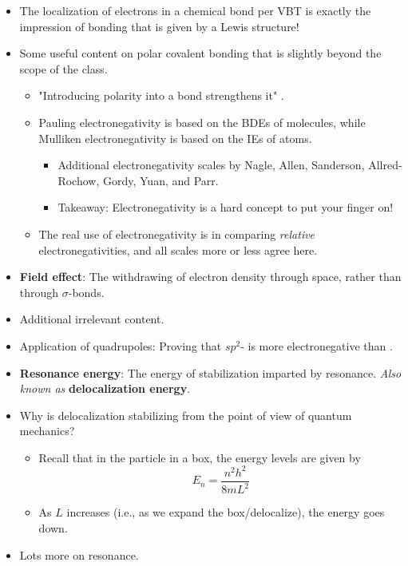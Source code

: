 \documentclass[../notes.tex]{subfiles}
\begin{document}
\begin{itemize}
    \item The localization of electrons in a chemical bond per VBT is exactly the impression of bonding that is given by a Lewis structure!
    \item Some useful content on polar covalent bonding that is slightly beyond the scope of the class.
    \begin{itemize}
        \item "Introducing polarity into a bond strengthens it" \parencite[12]{bib:Anslyn}.
        \item Pauling electronegativity is based on the BDEs of molecules, while Mulliken electronegativity is based on the IEs of atoms.
        \begin{itemize}
            \item Additional electronegativity scales by Nagle, Allen, Sanderson, Allred-Rochow, Gordy, Yuan, and Parr.
            \item Takeaway: Electronegativity is a hard concept to put your finger on!
        \end{itemize}
        \item The real use of electronegativity is in comparing \emph{relative} electronegativities, and all scales more or less agree here.
    \end{itemize}
    \item \textbf{Field effect}: The withdrawing of electron density through space, rather than through $\sigma$-bonds.
    \item Additional irrelevant content.
    \item Application of quadrupoles: Proving that $sp^2$- is more electronegative than .
    \item \textbf{Resonance energy}: The energy of stabilization imparted by resonance. \emph{Also known as} \textbf{delocalization energy}.
    \item Why is delocalization stabilizing from the point of view of quantum mechanics?
    \begin{itemize}
        \item Recall that in the particle in a box, the energy levels are given by
        \begin{equation*}
            E_n = \frac{n^2h^2}{8mL^2}
        \end{equation*}
        \item As $L$ increases (i.e., as we expand the box/delocalize), the energy goes down.
    \end{itemize}
    \item Lots more on resonance.
\end{itemize}
\end{document}
